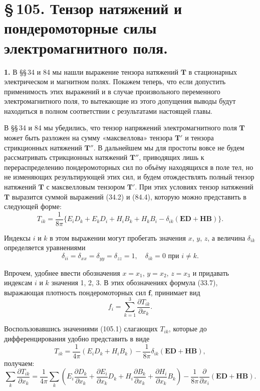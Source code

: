 \documentclass[a4paper,12pt]{article}
\begin{document}
\section*{\S\,105. Тензор натяжений и пондеромоторные силы
электромагнитного поля.}


\textbf{1.} В §§\,34 и 84 мы нашли выражение тензора натяжений
$\mathbf{T}$ в стационарных электрическом и магнитном полях. Покажем
теперь, что если допустить применимость этих выражений и в случае
произвольного переменного электромагнитного поля, то вытекающие из
этого допущения выводы будут находиться в полном соответствии с
результатами настоящей главы.


В §§\,34 и 84 мы убедились, что тензор напряжений электромагнитного
поля $\mathbf{T}$ может быть разложен на сумму «максвеллова» тензора
$\mathbf{T}'$ и тензора стрикционных натяжений $\mathbf{T}''$. В
дальнейшем мы для простоты вовсе не будем рассматривать стрикционных
натяжений $\mathbf{T}''$, приводящих лишь к перераспределению
пондеромоторных сил по объёму находящихся в поле тел, но не изменяющих
результирующей этих сил, и будем отождествлять полный тензор натяжений
$\mathbf{T}$ с максвелловым тензором $\mathbf{T}'$. При этих условиях
тензор натяжений $\mathbf{T}$ выразится суммой выражений (34.2) и (84.4),
которую можно представить в следующей форме:
\begin{equation}
    T_{ik} = \frac{1}{8\pi}\{E_i D_k + E_k D_i + H_i B_k + H_k B_i
           - \delta_{ik}(\mathbf{ED} + \mathbf{HB})\}.
    \tag{105.1}
\end{equation}

Индексы $i$ и $k$ в этом выражении могут пробегать значения $x$, $y$,
$z$, а величина $\delta_{ik}$ определяется уравнениями
\begin{equation}
    \delta_{ii} = \delta_{xx} = \delta_{yy} = \delta_{zz} = 1,
    \quad
    \delta_{ik} = 0 \text{ при } i \neq k.
    \tag{105.2}
\end{equation}

Впрочем, удобнее ввести обозначения $x = x_1$, $y = x_2$, $z = x_3$
и придавать индексам $i$ и $k$ значения 1, 2, 3. В этих обозначениях
формула (33.7), выражающая плотность пондеромоторных сил $\mathbf{f}$,
принимает вид
$$
    f_i = \sum_{k=1}^3 \frac{\partial T_{ik}}{\partial x_k}.
$$

Воспользовавшись значениями (105.1) слагающих $T_{ik}$, которые до
дифференцирования удобно представить в виде
$$
    T_{ik} = \frac{1}{4\pi}(E_i D_k + H_i B_k)
           - \frac{1}{8\pi}\delta_{ik}(\mathbf{ED} + \mathbf{HB}),
$$
получаем:
$$
    \sum_k\frac{\partial T_{ik}}{\partial x_k}
    = \frac{1}{4\pi}\sum_k\!\left(
        E_i\frac{\partial D_k}{\partial x_k}
      + \frac{\partial E_i}{\partial x_k}D_k
      + H_i\frac{\partial B_k}{\partial x_k}
      + \frac{\partial H_i}{\partial x_k}B_k
    \right)
    - \frac{1}{8\pi}\frac{\partial}{\partial x_i}(\mathbf{ED} + \mathbf{HB}).
$$
\end{document}
